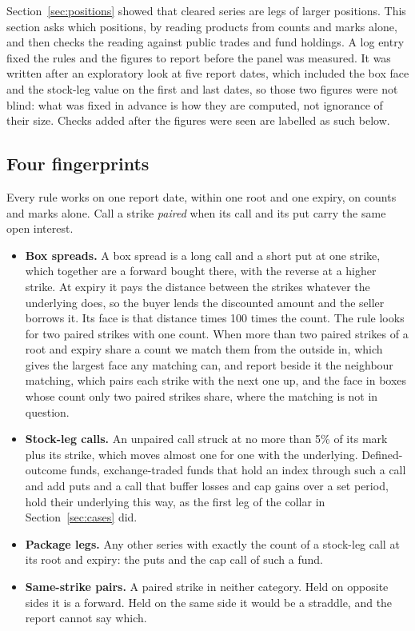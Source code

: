 \documentclass[11pt]{article}
\begin{document}
Section~\ref{sec:positions} showed that cleared series are legs of larger positions.
This section asks which positions, by reading products from counts and marks alone, and
then checks the reading against public trades and fund holdings. A log entry fixed the
rules and the figures to report before the panel was measured. It was written after an
exploratory look at five report dates, which included the box face and the stock-leg
value on the first and last dates, so those two figures were not blind: what was fixed
in advance is how they are computed, not ignorance of their size. Checks added after the
figures were seen are labelled as such below.

\subsection{Four fingerprints}
\label{sec:products}

Every rule works on one report date, within one root and one expiry, on counts and marks
alone. Call a strike \emph{paired} when its call and its put carry the same open
interest.

\begin{itemize}
\item \textbf{Box spreads.} A box spread is a long call and a short put at one strike,
which together are a forward bought there, with the reverse at a higher strike. At
expiry it pays the distance between the strikes whatever the underlying does, so the
buyer lends the discounted amount and the seller borrows it. Its face is that distance
times 100 times the count. The rule looks for two paired strikes with one count. When
more than two paired strikes of a root and expiry share a count we match them from the
outside in, which gives the largest face any matching can, and report beside it the
neighbour matching, which pairs each strike with the next one up, and the face in boxes
whose count only two paired strikes share, where the matching is not in question.
\item \textbf{Stock-leg calls.} An unpaired call struck at no more than 5\% of its mark
plus its strike, which moves almost one for one with the underlying. Defined-outcome
funds, exchange-traded funds that hold an index through such a call and add puts and a
call that buffer losses and cap gains over a set period, hold their underlying this way,
as the first leg of the collar in Section~\ref{sec:cases} did.
\item \textbf{Package legs.} Any other series with exactly the count of a stock-leg call
at its root and expiry: the puts and the cap call of such a fund.
\item \textbf{Same-strike pairs.} A paired strike in neither category. Held on opposite
sides it is a forward. Held on the same side it would be a straddle, and the report
cannot say which.
\end{itemize}
\end{document}
